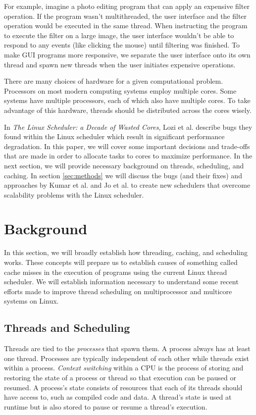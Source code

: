 \documentclass{sig-alternate}
\begin{document}
For example, imagine a photo editing program that can apply an expensive filter operation. If the program wasn't multithreaded, the user interface and the filter operation would be executed in the same thread. When instructing the program to execute the filter on a large image, the user interface wouldn't be able to respond to any events (like clicking the mouse) until filtering was finished. To make GUI programs more responsive, we separate the user interface onto its own thread and spawn new threads when the user initiates expensive operations.

There are many choices of hardware for a given computational problem. Processors on most modern computing systems employ multiple cores. Some systems have multiple processors, each of which also have multiple cores. To take advantage of this hardware, threads should be distributed across the cores wisely.

In \emph{The Linux Scheduler: a Decade of Wasted Cores}, Lozi et al. describe bugs they found within the Linux scheduler which result in significant performance degradation. In this paper, we will cover some important decisions and trade-offs that are made in order to allocate tasks to cores to maximize performance. In the next section, we will provide necessary background on threads, scheduling, and caching. In section \ref{sec:methods} we will discuss the bugs (and their fixes) and approaches by Kumar et al. and Jo et al. to create new schedulers that overcome scalability problems with the Linux scheduler.
\section{Background}
\label{sec:bg}

In this section, we will broadly establish how threading, caching, and scheduling works. These concepts will prepare us to establish causes of something called cache misses in the execution of programs using the current Linux thread scheduler. We will establish information necessary to understand some recent efforts made to improve thread scheduling on multiprocessor and multicore systems on Linux.

\subsection{Threads and Scheduling}
\label{sec:threads}

Threads are tied to the \emph{processes} that spawn them. A process always has at least one thread. Processes are typically independent of each other while threads exist within a process. \emph{Context switching} within a CPU is the process of storing and restoring the state of a process or thread so that execution can be paused or resumed. A process's state consists of resources that each of its threads should have access to, such as compiled code and data. A thread's state is used at runtime but is also stored to pause or resume a thread's execution.
\end{document}
